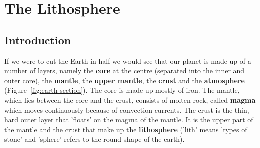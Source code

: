 \chapter{The Lithosphere}
\label{chap:lith}



\section{Introduction}
\label{sec:lith:intro}

If we were to cut the Earth in half we would see that our planet is made up of a number of layers, namely the \textbf{core} at the centre (separated into the inner and outer core), the \textbf{mantle}, the \textbf{upper mantle}, the \textbf{crust} and the \textbf{atmosphere} (Figure~\ref{fig:earth section}). The core is made up mostly of iron. The mantle, which lies between the core and the crust, consists of molten rock, called \textbf{magma} which moves continuously because of convection currents. The crust is the thin, hard outer layer that 'floats' on the magma of the mantle. It is the upper part of the mantle and the crust that make up the \textbf{lithosphere} ('lith' means 'types of stone' and 'sphere' refers to the round shape of the earth). \\
